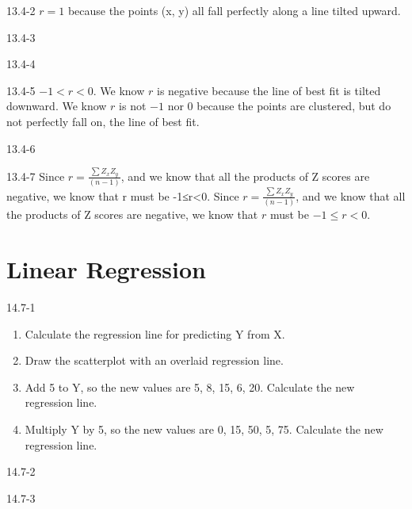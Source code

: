 \begin{exsol@solution}{13.4-2}
$r = 1$ because the points (x, y) all fall perfectly along a line tilted upward.

\end{exsol@solution}
\begin{exsol@solution}{13.4-3}
\end{exsol@solution}
\begin{exsol@solution}{13.4-4}

\end{exsol@solution}
\begin{exsol@solution}{13.4-5}
$ -1 < r < 0$. We know $r$ is negative because the line of best fit is tilted downward. We know $r$ is not $-1$ nor $0$ because the points are clustered, but do not perfectly fall on, the line of best fit.

\end{exsol@solution}
\begin{exsol@solution}{13.4-6}
\end{exsol@solution}
\begin{exsol@solution}{13.4-7}
Since $ r = \frac{ \sum Z_x Z_y}{(n - 1)}$, and we know that all the products of Z scores are negative, we know that r must be -1≤r<0. Since $ r = \frac{ \sum Z_x Z_y}{(n - 1)}$, and we know that all the products of Z scores are negative, we know that $r$ must be $-1 \le r < 0$.
\end{exsol@solution}
\setcounter{chapter}{14}\chapter{Linear Regression}
\begin{exsol@solution}{14.7-1}
\begin{enumerate}
  \item Calculate the regression line for predicting Y from X.
  \item Draw the scatterplot with an overlaid regression line.
  \item Add 5 to Y, so the new values are 5, 8, 15, 6, 20.  Calculate the new regression line.
  \item Multiply Y by 5, so the new values are 0, 15, 50, 5, 75.  Calculate the new regression line.
\end{enumerate}

\end{exsol@solution}
\begin{exsol@solution}{14.7-2}
\end{exsol@solution}
\begin{exsol@solution}{14.7-3}

\end{exsol@solution}
